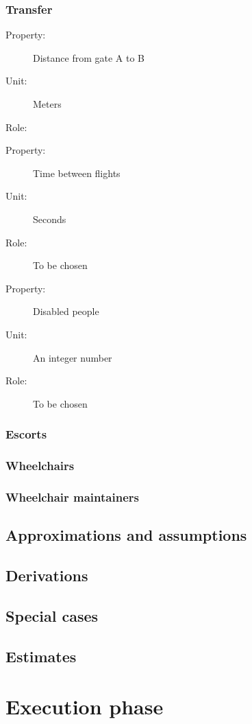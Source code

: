 \documentclass[a4paper, 12pt, notitlepage]{report}
\begin{document}
\subsection{Transfer} 
\begin{description}
\item[Property:] Distance from gate A to B
\item[Unit:] Meters
\item[Role:] 
\end{description}
\begin{description}
\item[Property:] Time between flights
\item[Unit:] Seconds
\item[Role:] To be chosen
\end{description}
\begin{description}
\item[Property:] Disabled people
\item[Unit:] An integer number
\item[Role:] To be chosen
\end{description}
\subsection{Escorts}
\subsection{Wheelchairs}
\subsection{Wheelchair maintainers}

\section{Approximations and assumptions}
\section{Derivations}
\section{Special cases}
\section{Estimates}

\chapter{Execution phase}
\end{document}
